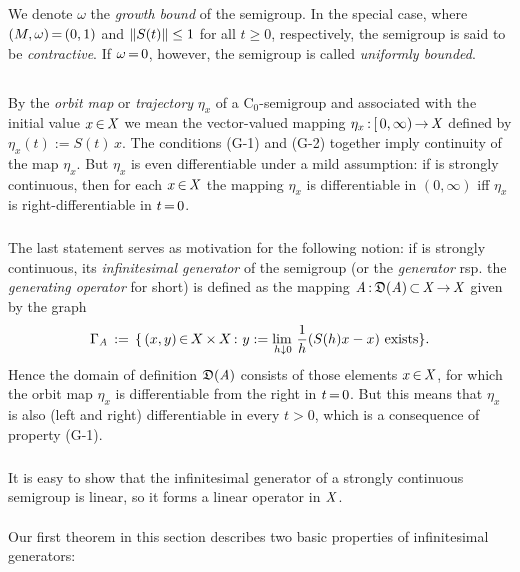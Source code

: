 \documentclass[11pt,twoside]{article}
\begin{document}
\subparagraph{} %
We denote $\omega$ the \textit{growth bound} of the semigroup.
In the special case,
where $(M,\omega) {\,=\,} (0,1)$ and $\left\lVert S(t) \right\rVert \leq 1$ for all $t \geq 0$,
respectively,
the semigroup is said to be \textit{contractive}.
If $\omega {\,=\,} 0$,
however,
the semigroup is called \textit{uniformly bounded}.

\subsection{} %
By the \textit{orbit map} or \textit{trajectory} $\eta_x$
of a C$_0$-semigroup {\SG}
and associated with the initial value $x {\,\in\,} \mathit{X}$
we mean the vector-valued mapping $\eta_x {\,:\,} [\,0,\infty) {\,\to\,} \mathit{X}$
defined by $\eta_x(t) := S(t) \, x$.
The conditions (G-1) and (G-2) together
imply continuity of the map $\eta_x$.
But $\eta_x$ is even differentiable under a mild assumption:
if {\SG} is strongly continuous,
then for each $x {\,\in\,} \mathit{X}$
the mapping $\eta_x$ is differentiable in $(0,\infty)$
iff $\eta_x$ is right-differentiable in $t {\,=\,} 0$.

\subparagraph{} %
The last statement serves as motivation for the following notion:
if {\SG} is strongly continuous,
its \textit{infinitesimal generator} of the semigroup
(or the \textit{generator} rsp. the \textit{generating operator} for short)
is defined as the mapping $\mathit{A} {\,:\,} \mathfrak{D}(\mathit{A}) {\,\subset\,} \mathit{X} {\,\to\,} \mathit{X}$
given by the graph
\[
\Gamma_{\mathit{A}} \,:=\,
\{\,(x,y) {\,\in\,} X {\,\times\,} X {\,:\,} \,
y := \lim_{\,h \downarrow 0} \, \frac{1}{h}({S}(h)x-x) \mbox{ exists} \}.
\]
Hence the domain of definition $\mathfrak{D}(\mathit{A})$ consists
of those elements $x {\,\in\,} \mathit{X}$,
for which the orbit map $\eta_x$ is differentiable from the right in $t {\,=\,} 0$.
But this means that
$\eta_x$ is also (left and right) differentiable in every $t>0$,
which is a consequence of property (G-1).

\subparagraph{} %
It is easy to show that
the infinitesimal generator of a strongly continuous semigroup is linear,
so it forms a linear operator in $\mathit{X}$.

\paragraph{} %
Our first theorem in this section describes two basic properties
of infinitesimal generators:
\end{document}
